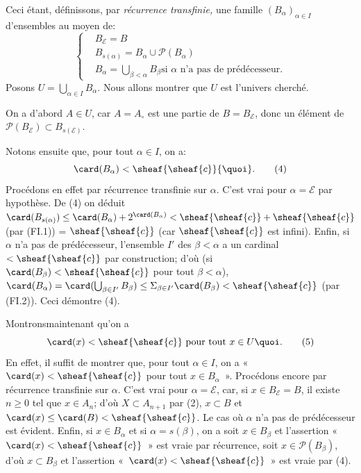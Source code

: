 Ceci étant, définissons, par \emph{récurrence transfinie,} une
famille $(B_{\alpha})_{\alpha\in I}$ d'ensembles au moyen de:
\begin{equation}
\begin{cases}
& B_{\mathcal{E}}=B\\
& B_{s(\alpha)}=B_{\alpha}\cup \mathcal{P}(B_{\alpha})\\
& B_{\alpha}={\displaystyle{\bigcup_{\beta<\alpha}}}B_{\beta}\mbox{
si $\alpha$ n'a pas de prédécesseur.}
\end{cases}\tag{3}
\end{equation}
Posons $U=\bigcup_{\alpha\in I}B_{\alpha}$. Nous allons montrer que
$U$ est l'univers cherché.

On a d'abord $A\in U$, car $A=A_{\circ}$ est une partie de
$B=B_{\mathcal{E}}$, donc un élément de
$\mathcal{P}(B_{\mathcal{E}})\subset B_{s(\mathcal{E})}$.

Notons ensuite que, pour tout $\alpha \in I$, on a:
\begin{equation}
\card(B_{\alpha})<\sheaf{\sheaf{c}}{\quoi}.\tag{4}
\end{equation}
Procédons en effet par récurrence transfinie sur $\alpha$. C'est
vrai pour $\alpha=\mathcal{E}$ par hypothèse. De (4) on déduit
$\card(B_{s(\alpha)})\leq
\card(B_{\alpha})+2^{\card(B_{\alpha})}<\sheaf{\sheaf{c}}+\sheaf{\sheaf{c}}$
(par (FI.1)) = $\sheaf{\sheaf{c}}$ (car $\sheaf{\sheaf{c}}$ est
infini). Enfin, si $\alpha$ n'a pas de prédécesseur, l'ensemble $I'$
des $\beta<\alpha$ a un cardinal $<\sheaf{\sheaf{c}}$ par
construction; d'où (si $\card(B_{\beta})<\sheaf{\sheaf{c}}$ pour
tout $\beta<\alpha$), $\card(B_{\alpha})=\card(\bigcup_{\beta\in I'}
B_{\beta})\leq \Sigma_{\beta\in
I'}\card(B_{\beta})<\sheaf{\sheaf{c}}$ (par (FI.2)). Ceci démontre
(4).

Montrons\pageoriginale maintenant qu'on a
\begin{equation}
\card(x)<\sheaf{\sheaf{c}}\mbox{ pour tout } x\in U{\quoi}.\tag{5}
\end{equation}
En effet, il suffit de montrer que, pour tout $\alpha\in I$, on a
« $\card(x)<\sheaf{\sheaf{c}}$ pour tout $x\in B_{\alpha}$ ».
Procédons encore par récurrence transfinie sur $\alpha$. C'est vrai
pour $\alpha=\mathcal{E}$, car, si $x\in B_{\mathcal{E}}=B$, il
existe $n\geq 0$ tel que $x\in A_n$; d'où $X\subset A_{n+1}$ par
(2), $x\subset B$ et $\card(x)\leq \card(B)<\sheaf{\sheaf{c}}$. Le
cas où $\alpha$ n'a pas de prédécesseur est évident. Enfin, si $x\in
B_{\alpha}$ et si $\alpha=s(\beta)$, on a soit $x\in B_{\beta}$ et
l'assertion « $\card(x)<\sheaf{\sheaf{c}}$ » est vraie par
récurrence, soit $x\in\mathcal{P}(B_{\beta})$, d'où $x\subset
B_{\beta}$ et l'assertion « $\card(x)<\sheaf{\sheaf{c}}$ » est
vraie par (4).

